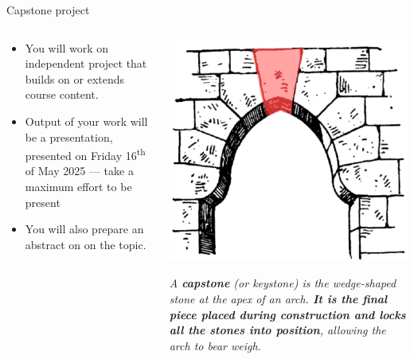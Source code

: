 \begin{frame}{Capstone project}
\begin{columns}
    \begin{column}{0.55\textwidth}
        \begin{itemize}
            \item You will work on independent project that builds on or extends course content.  
            \item Output of your work will be a presentation, presented on Friday 16\textsuperscript{th} of May 2025 --- take a maximum effort to be present
            \item You will also prepare an abstract on on the topic.
        \end{itemize}
    \end{column}
    \begin{column}{0.45\textwidth}
    \footnotesize
    \begin{center}
        \includegraphics[scale = 0.75]{lesson_1/images/capstone.png} 
        \end{center}
    \vspace{1em}
       \textit{ A  \textbf{capstone} (or keystone) is the wedge-shaped stone at the apex of an arch. \textbf{It is the final piece placed during construction and locks all the stones into position}, allowing the arch to bear weigh.}
 
    \end{column}
\end{columns}
    
\end{frame}

